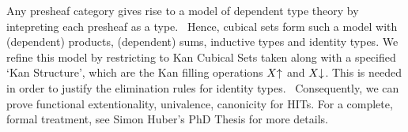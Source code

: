 Any presheaf category gives rise to a model of dependent type theory by intepreting each presheaf as a type.~\cite{hofmann97} 
Hence, cubical sets form such a model with (dependent) products, (dependent) sums, inductive types and identity types.
We refine this model by restricting to Kan Cubical Sets taken along with a specified `Kan Structure',
which are the Kan filling operations $X \mathord{\uparrow}$ and $X \mathord{\downarrow}$. This is needed in order to justify the elimination rules for identity types.~\cite{bezem2014model}
Consequently, we can prove functional extentionality, univalence, canonicity for HITs.
For a complete, formal treatment, see Simon Huber's PhD Thesis for more details.~\cite{huberphd}


